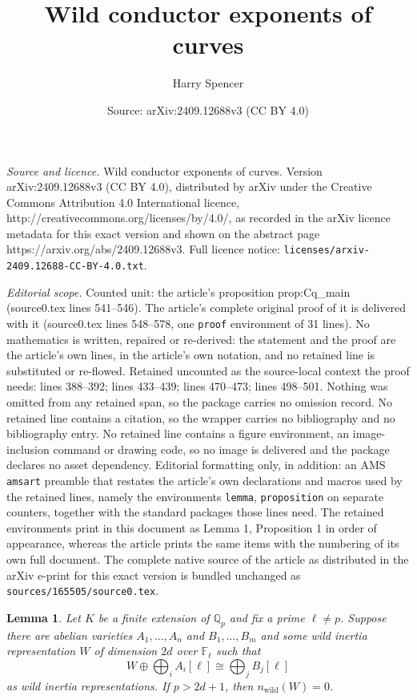 \documentclass[10pt,a4paper]{amsart}
\title{Wild conductor exponents of curves}
\author{Harry Spencer}
\date{Source: arXiv:2409.12688v3 (CC BY 4.0)}
\newtheorem{lemma}{Lemma}
\newcommand{\FF}{\mathbb{F}}
\newcommand{\QQ}{\mathbb{Q}}
\DeclareMathOperator{\wild}{wild}
\begin{document}
\maketitle

\noindent\emph{Source and licence.} Wild conductor exponents of curves. Version arXiv:2409.12688v3 (CC BY 4.0), distributed by arXiv under the Creative Commons Attribution 4.0 International licence, http://creativecommons.org/licenses/by/4.0/, as recorded in the arXiv licence metadata for this exact version and shown on the abstract page https://arxiv.org/abs/2409.12688v3. Full licence notice: \texttt{licenses/arxiv-2409.12688-CC-BY-4.0.txt}.\par\smallskip

\noindent\textit{Editorial scope.} Counted unit: the article's proposition prop:Cq\_main (source0.tex lines 541--546). The article's complete original proof of it is delivered with it (source0.tex lines 548--578, one \texttt{proof} environment of 31 lines). No mathematics is written, repaired or re-derived: the statement and the proof are the article's own lines, in the article's own notation, and no retained line is substituted or re-flowed.  Retained uncounted as the source-local context the proof needs: lines 388--392; lines 433--439; lines 470--473; lines 498--501.  Nothing was omitted from any retained span, so the package carries no omission record.  No retained line contains a citation, so the wrapper carries no bibliography and no bibliography entry.  No retained line contains a figure environment, an image-inclusion command or drawing code, so no image is delivered and the package declares no asset dependency.  Editorial formatting only, in addition: an AMS \texttt{amsart} preamble that restates the article's own declarations and macros used by the retained lines, namely the environments \texttt{lemma}, \texttt{proposition} on separate counters, together with the standard packages those lines need.  The retained environments print in this document as Lemma 1, Proposition 1 in order of appearance, whereas the article prints the same items with the numbering of its own full document.  The complete native source of the article as distributed in the arXiv e-print for this exact version is bundled unchanged as \texttt{sources/165505/source0.tex}.
\begin{lemma}\label{lem:0wild}
    Let $K$ be a finite extension of $\QQ_p$ and fix a prime $\ell\ne p$. Suppose there are abelian varieties $A_1,\hdots,A_n$ and $B_1,\hdots,B_m$ and some wild inertia representation $W$ of dimension $2d$ over $\FF_\ell$ such that
    \[W\oplus\bigoplus_i A_i[\ell]\cong \bigoplus_j B_j[\ell]\]
    as wild inertia representations. If $p>2d+1$, then $n_{\wild}(W)=0$.
\end{lemma}
\end{document}
